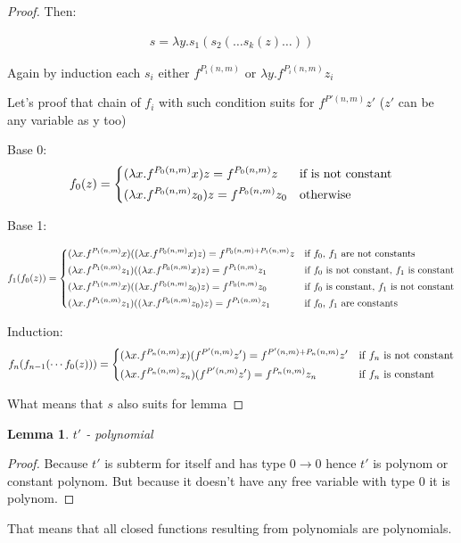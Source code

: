 \documentclass[11pt]{article}
\newtheorem{lemma}[theorem]{Lemma}
\newcommand{\gl}{\lambda}
\newcommand{\too}{\rightarrow}
\begin{document}
\begin{proof}
Then:

\begin{align*}
    s = \gl y. s_1(s_2(\dots s_k(z) \dots))
\end{align*}

Again by induction each \(s_i\) either \(f^{P_i(n, m)}\) or \(\gl y.f^{P_i(n, m)} z_i\)

Let's proof that chain of \(f_i\) with such condition suits for \(f^{P'(n, m)} z'\) (\(z'\) can be any variable as y too)

Base 0: 
\[
    f_0 (z) = 
\begin{dcases}
    (\gl x. f^{P_0(n, m)} x) z = f^{P_0(n, m)} z & \text{if is not constant} \\
    (\gl x. f^{P_0(n, m)} z_0) z = f^{P_0(n, m)} z_0 & \text{otherwise}
\end{dcases}
\]

Base 1:

\[
f_1 (f_0(z)) =
\begin{dcases}
    (\gl x. f^{P_1(n, m)} x) ((\gl x. f^{P_0(n, m)} x) z)  = f^{P_0(n, m) + P_1(n, m)} z & \text{if \(f_0\), \(f_1\) are not constants} \\
    (\gl x. f^{P_1(n, m)} z_1) ((\gl x. f^{P_0(n, m)} x) z) = f^{P_1(n, m)} z_1 & \text{if \(f_0\) is not constant, \(f_1\) is constant} \\
    (\gl x. f^{P_1(n, m)} x) ((\gl x. f^{P_0(n, m)} z_0) z) = f^{P_0(n, m)} z_0 & \text{if \(f_0\) is constant, \(f_1\) is not constant} \\
    (\gl x. f^{P_1(n, m)} z_1) ((\gl x. f^{P_0(n, m)} z_0) z) = f^{P_1(n, m)} z_1 & \text{if \(f_0\), \(f_1\) are constants} \\
\end{dcases}
\]

Induction:
\[
    f_n (f_{n - 1}(\cdots f_0(z))) =
\begin{dcases}
    (\gl x. f^{P_n(n, m)} x) (f^{P'(n, m)} z') = f^{P'(n, m) + P_n(n, m)} z' & \text{if \(f_n\) is not constant} \\
    (\gl x. f^{P_n(n, m)} z_n) (f^{P'(n, m)} z') = f^{P_n(n, m)} z_n & \text{if \(f_n\) is constant} \\
\end{dcases}
\]

What means that \(s\) also suits for lemma

\end{proof}

\begin{lemma}
    \(t'\) - polynomial
\end{lemma}

\begin{proof}
    Because \(t'\) is subterm for itself and has type \(0 \too 0\) hence \(t'\) is polynom or constant polynom.
    But because it doesn't have any free variable with type \(0\) it is polynom.  
\end{proof}

That means that all closed functions resulting from polynomials are polynomials.
\end{document}
